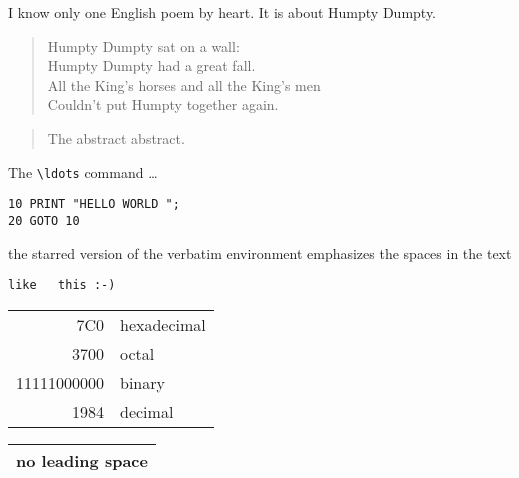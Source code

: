 \documentclass[a4paper, 11pt]{article}
\begin{document}
I know only one English poem by heart. It is about Humpty Dumpty.
\begin{flushleft}
  \begin{verse}
    Humpty Dumpty sat on a wall:\\
    Humpty Dumpty had a great fall.\\
    All the King's horses and all the King's men\\
    Couldn't put Humpty together again.
  \end{verse}
\end{flushleft}


\begin{abstract}
  The abstract abstract.
\end{abstract}





The \verb|\ldots| command \ldots

\begin{verbatim}
10 PRINT "HELLO WORLD ";
20 GOTO 10
\end{verbatim}

\begin{verbatim*}
the starred version of the       verbatim
environment emphasizes the spaces    in the text
\end{verbatim*}

\verb*|like   this :-) |




\begin{tabular}{|r|l|}
\hline
  7C0 & hexadecimal \\
  3700 & octal \\ 

  \cline{2-2}
  11111000000 & binary \\

\hline 
\hline
  1984 & decimal \\
\hline
\end{tabular}


\begin{tabular}{@{} l @{}}
\hline
  no leading space\\
\hline
\end{tabular}
\end{document}
